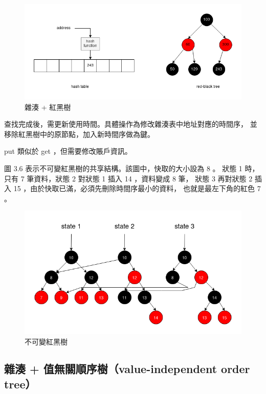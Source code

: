 \begin{figure}[h!]
\includegraphics[width=\textwidth]{雜湊紅黑樹}
\caption{雜湊 + 紅黑樹}
\end{figure}

查找完成後，需更新使用時間。具體操作為修改雜湊表中地址對應的時間序，
並移除紅黑樹中的原節點，加入新時間序做為鍵。

put 類似於 get ，但需要修改賬戶資訊。

圖 3.6 表示不可變紅黑樹的共享結構。該圖中，快取的大小設為 8 。
狀態 1 時，只有 7 筆資料，狀態 2 對狀態 1 插入 14 ，資料變成 8 筆，
狀態 3 再對狀態 2 插入 15 ，由於快取已滿，必須先刪除時間序最小的資料，
也就是最左下角的紅色 7 。

\begin{figure}[h!]
\includegraphics[width=\textwidth]{不可變紅黑樹}
\caption{不可變紅黑樹}
\end{figure}


\subsection{雜湊 + 值無關順序樹（value-independent order tree）}

